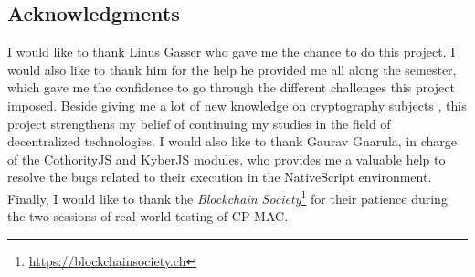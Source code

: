\subsection*{Acknowledgments}
I would like to thank Linus Gasser who gave me the chance to do this project. I would also like to thank him for the help he provided me all along the semester, which gave me the confidence to go through the different challenges this project imposed. Beside giving me a lot of new knowledge on  cryptography subjects , this project strengthens my belief of continuing my studies in the field of decentralized technologies. I would also like to thank Gaurav Gnarula, in charge of the CothorityJS and KyberJS modules, who provides me a valuable help to resolve the bugs related to their execution in the NativeScript environment. Finally, I would like to thank the \textit{Blockchain Society}\footnote{\url{https://blockchainsociety.ch}} for their patience during the two sessions of real-world testing of CP-MAC.